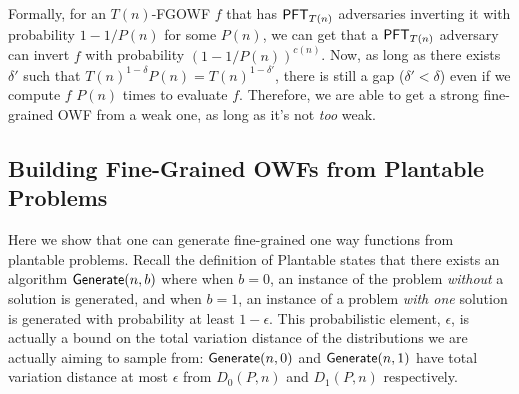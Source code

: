 Formally, for an $T(n)$-FGOWF $f$ that has $\mathsf{PFT}_{T(n)}$ adversaries inverting it with probability $1 - 1/P(n)$ for some $P(n)$, we can get that a $\mathsf{PFT}_{T(n)}$ adversary can invert $f$ with probability $(1 - 1/P(n))^{c(n)}$. Now, as long as there exists $\delta'$ such that $T(n)^{1-\delta}P(n) = T(n)^{1-\delta'}$, there is still a gap ($\delta' < \delta$) even if we compute $f$ $P(n)$ times to evaluate $f$. Therefore, we are able to get a strong fine-grained OWF from a weak one, as long as it's not \emph{too} weak.

\subsection{Building Fine-Grained OWFs from Plantable Problems}\label{sec:building-fgowfs}

Here we show that one can generate fine-grained one way functions from plantable problems. Recall the definition of Plantable states that there exists an algorithm $\mathsf{Generate}(n,b)$ where when $b=0$, an instance of the problem \emph{without} a solution is generated, and when $b=1$, an instance of a problem \emph{with one} solution is generated with probability at least $1 - \epsilon$. This probabilistic element, $\epsilon$, is actually a bound on the total variation distance of the distributions we are actually aiming to sample from: $\mathsf{Generate}(n,0)$ and $\mathsf{Generate}(n,1)$ have total variation distance at most $\epsilon$ from $D_0(P,n)$ and $D_1(P,n)$ respectively.

